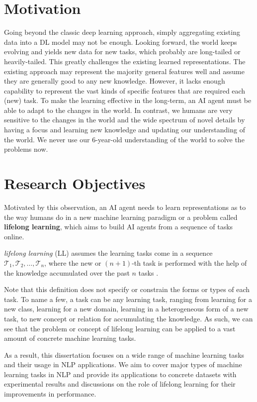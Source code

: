 \section{Motivation}
\label{chap1:motivation}
Going beyond the classic deep learning approach, simply aggregating existing data into a DL model may not be enough.
Looking forward, the world keeps evolving and yields new data for new tasks, which probably are long-tailed or heavily-tailed.
This greatly challenges the existing learned representations.
The existing approach may represent the majority general features well and assume they are generally good to any new knowledge.
However, it lacks enough capability to represent the vast kinds of specific features that are required each (new) task.
To make the learning effective in the long-term, an AI agent must be able to adapt to the changes in the world.
In contrast, we humans are very sensitive to the changes in the world and the wide spectrum of novel details by having a focus and learning new knowledge and updating our understanding of the world.
We never use our 6-year-old understanding of the world to solve the problems now. 

\section{Research Objectives}
Motivated by this observation, an AI agent needs to learn representations as to the way humans do in a new machine learning paradigm or a problem called \textbf{lifelong learning}, which aims to build AI agents from a sequence of tasks online.

\textit{lifelong learning} (LL) assumes the learning tasks come in a sequence $\mathcal{T}_1, \mathcal{T}_2, \dots, \mathcal{T}_n$, where the new or $(n+1)$-th task is performed with the help of the knowledge accumulated over the past $n$ tasks \cite{thrun1998lifelong,silver2013lifelong,chen2018lifelong}. 

Note that this definition does not specify or constrain the forms or types of each task.
To name a few, a task can be any learning task, ranging from learning for a new class, learning for a new domain, learning in a heterogeneous form of a new task, to new concept or relation for accumulating the knowledge.
As such, we can see that the problem or concept of lifelong learning can be applied to a vast amount of concrete machine learning tasks.

As a result, this dissertation focuses on a wide range of machine learning tasks and their usage in NLP applications.
We aim to cover major types of machine learning tasks in NLP and provide its applications to concrete datasets with experimental results and discussions on the role of lifelong learning for their improvements in performance.

